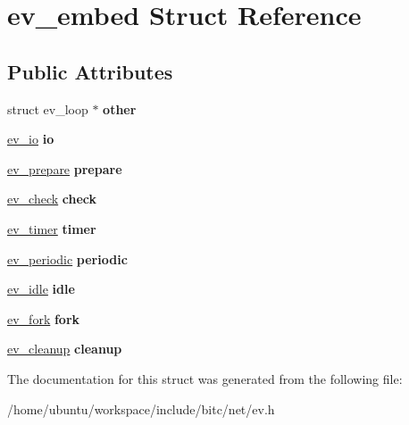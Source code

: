 \hypertarget{structev__embed}{\section{ev\-\_\-embed Struct Reference}
\label{structev__embed}
}
\subsection*{Public Attributes}
\begin{DoxyCompactItemize}
\item 
\hypertarget{structev__embed_acb0b3a48271177125760d6b9914e71a7}{struct ev\-\_\-loop $\ast$ {\bfseries other}}\label{structev__embed_acb0b3a48271177125760d6b9914e71a7}

\item 
\hypertarget{structev__embed_ab085dde44a1b194137db275caa1cfaa4}{\hyperlink{structev__io}{ev\-\_\-io} {\bfseries io}}\label{structev__embed_ab085dde44a1b194137db275caa1cfaa4}

\item 
\hypertarget{structev__embed_a779a812e0c15c15df660c210ee82fb62}{\hyperlink{structev__prepare}{ev\-\_\-prepare} {\bfseries prepare}}\label{structev__embed_a779a812e0c15c15df660c210ee82fb62}

\item 
\hypertarget{structev__embed_a96ff5f39de1b7d6c6ac914933063b2f8}{\hyperlink{structev__check}{ev\-\_\-check} {\bfseries check}}\label{structev__embed_a96ff5f39de1b7d6c6ac914933063b2f8}

\item 
\hypertarget{structev__embed_a52f8a6147c42ecfe547a44b1f391762d}{\hyperlink{structev__timer}{ev\-\_\-timer} {\bfseries timer}}\label{structev__embed_a52f8a6147c42ecfe547a44b1f391762d}

\item 
\hypertarget{structev__embed_aafa62ad98fab654b15c2128ea4b6b167}{\hyperlink{structev__periodic}{ev\-\_\-periodic} {\bfseries periodic}}\label{structev__embed_aafa62ad98fab654b15c2128ea4b6b167}

\item 
\hypertarget{structev__embed_a133d7aa3da26a48be70e26eb32aed3d7}{\hyperlink{structev__idle}{ev\-\_\-idle} {\bfseries idle}}\label{structev__embed_a133d7aa3da26a48be70e26eb32aed3d7}

\item 
\hypertarget{structev__embed_ad1d0209f5e2006e373028e8cb206c10b}{\hyperlink{structev__fork}{ev\-\_\-fork} {\bfseries fork}}\label{structev__embed_ad1d0209f5e2006e373028e8cb206c10b}

\item 
\hypertarget{structev__embed_ac072a5985c406408336aad8b1178ed13}{\hyperlink{structev__cleanup}{ev\-\_\-cleanup} {\bfseries cleanup}}\label{structev__embed_ac072a5985c406408336aad8b1178ed13}

\end{DoxyCompactItemize}


The documentation for this struct was generated from the following file\-:\begin{DoxyCompactItemize}
\item 
/home/ubuntu/workspace/include/bitc/net/ev.\-h\end{DoxyCompactItemize}
